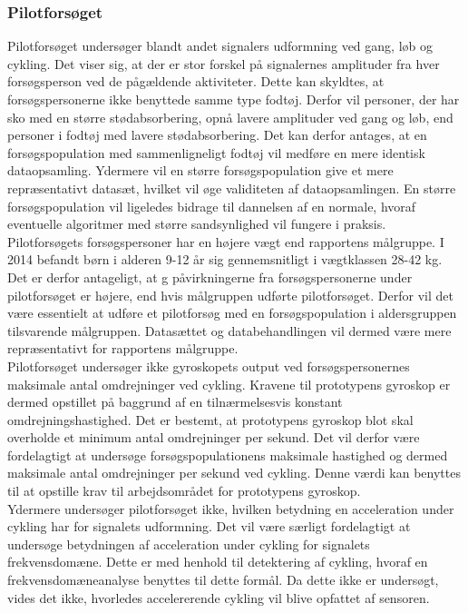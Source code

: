 \subsubsection{Pilotforsøget}
Pilotforsøget undersøger blandt andet signalers udformning ved gang, løb og cykling. Det viser sig, at der er stor forskel på signalernes amplituder fra hver forsøgsperson ved de pågældende aktiviteter. Dette kan skyldtes, at forsøgspersonerne ikke benyttede samme type fodtøj. Derfor vil personer, der har sko med en større stødabsorbering, opnå lavere amplituder ved gang og løb, end personer i fodtøj med lavere stødabsorbering. Det kan derfor antages, at en forsøgspopulation med sammenligneligt fodtøj vil medføre en mere identisk dataopsamling. Ydermere vil en større forsøgspopulation give et mere repræsentativt datasæt, hvilket vil øge validiteten af dataopsamlingen. En større forsøgspopulation vil ligeledes bidrage til dannelsen af en normale, hvoraf eventuelle algoritmer med større sandsynlighed vil fungere i praksis.\\
Pilotforsøgets forsøgspersoner har en højere vægt end rapportens målgruppe. I 2014 befandt børn i alderen 9-12 år sig gennemsnitligt i vægtklassen 28-42 kg. \citep{Rigsholspitalet2014} Det er derfor antageligt, at g påvirkningerne fra forsøgspersonerne under pilotforsøget er højere, end hvis målgruppen udførte pilotforsøget. Derfor vil det være essentielt at udføre et pilotforsøg med en forsøgspopulation i aldersgruppen tilsvarende målgruppen. Datasættet og databehandlingen vil dermed være mere repræsentativt for rapportens målgruppe.\\
Pilotforsøget undersøger ikke gyroskopets output ved forsøgspersonernes maksimale antal omdrejninger ved cykling. Kravene til prototypens gyroskop er dermed opstillet på baggrund af en tilnærmelsesvis konstant omdrejningshastighed. Det er bestemt, at prototypens gyroskop blot skal overholde et minimum antal omdrejninger per sekund. Det vil derfor være fordelagtigt at undersøge forsøgspopulationens maksimale hastighed og dermed maksimale antal omdrejninger per sekund ved cykling. Denne værdi kan benyttes til at opstille krav til arbejdsområdet for prototypens gyroskop.\\
Ydermere undersøger pilotforsøget ikke, hvilken betydning en acceleration under cykling har for signalets udformning. Det vil være særligt fordelagtigt at undersøge betydningen af acceleration under cykling for signalets frekvensdomæne. Dette er med henhold til detektering af cykling, hvoraf en frekvensdomæneanalyse benyttes til dette formål. Da dette ikke er undersøgt, vides det ikke, hvorledes accelererende cykling vil blive opfattet af sensoren.

